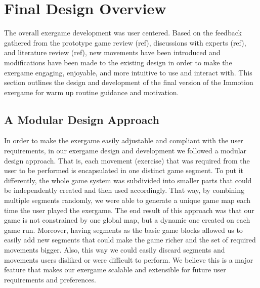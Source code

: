 \chapter{Final Design Overview}\label{chapter:finaldesign}
The overall exergame development was user centered. Based on the feedback gathered from the prototype game review (ref), discussions with experts (ref), and literature review (ref), new movements have been introduced and modifications have been made to the existing design in order to make the exergame engaging, enjoyable, and more intuitive to use and interact with. This section outlines the design and development of the final version of the Immotion exergame for warm up routine guidance and motivation.
\section{A Modular Design Approach}
In order to make the exergame easily adjustable and compliant with the user requirements, in our exergame design and development we followed a modular design approach. That is, each movement (exercise) that was required from the user to be performed is encapsulated in one distinct game segment. To put it differently, the whole game system was subdivided into smaller parts that could be independently created and then used accordingly. That way, by combining multiple segments randomly, we were able to generate a unique game map each time the user played the exergame. The end result of this approach was that our game is not constrained by one global map, but a dynamic one created on each game run. Moreover, having segments as the basic game blocks allowed us to easily add new segments that could make the game richer and the set of required movements bigger. Also, this way we could easily discard segments and movements users disliked or were difficult to perform. We believe this is a major feature that makes our exergame scalable and extensible for future user requirements and preferences. 
